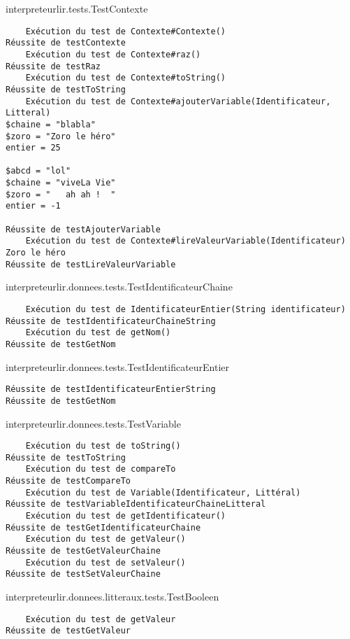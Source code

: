 \begin{enum}
    \item interpreteurlir.tests.TestContexte
\begin{verbatim}
    Exécution du test de Contexte#Contexte()
Réussite de testContexte
    Exécution du test de Contexte#raz()
Réussite de testRaz
    Exécution du test de Contexte#toString()
Réussite de testToString
    Exécution du test de Contexte#ajouterVariable(Identificateur, Litteral)
$chaine = "blabla"
$zoro = "Zoro le héro"
entier = 25

$abcd = "lol"
$chaine = "viveLa Vie"
$zoro = "   ah ah !  "
entier = -1

Réussite de testAjouterVariable
    Exécution du test de Contexte#lireValeurVariable(Identificateur)
Zoro le héro
Réussite de testLireValeurVariable
\end{verbatim}

    \item interpreteurlir.donnees.tests.TestIdentificateurChaine
\begin{verbatim}
    Exécution du test de IdentificateurEntier(String identificateur)
Réussite de testIdentificateurChaineString
    Exécution du test de getNom()
Réussite de testGetNom
\end{verbatim}

    \item interpreteurlir.donnees.tests.TestIdentificateurEntier
\begin{verbatim}
Réussite de testIdentificateurEntierString
Réussite de testGetNom
\end{verbatim}


    \item interpreteurlir.donnees.tests.TestVariable
\begin{verbatim}
    Exécution du test de toString()
Réussite de testToString
    Exécution du test de compareTo
Réussite de testCompareTo
    Exécution du test de Variable(Identificateur, Littéral)
Réussite de testVariableIdentificateurChaineLitteral
    Exécution du test de getIdentificateur()
Réussite de testGetIdentificateurChaine
    Exécution du test de getValeur()
Réussite de testGetValeurChaine
    Exécution du test de setValeur()
Réussite de testSetValeurChaine
\end{verbatim}

    \item interpreteurlir.donnees.litteraux.tests.TestBooleen
\begin{verbatim}
    Exécution du test de getValeur
Réussite de testGetValeur
\end{verbatim}


\end{enum}
